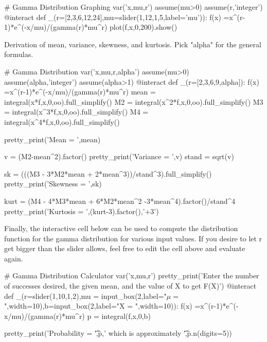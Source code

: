 \documentclass[10pt,]{book}
\numberwithin{equation}{section}
\begin{document}
%
\par
\hypertarget{p-992}{}%
\leavevmode%
%
\par
\hypertarget{p-993}{}%
\leavevmode%
\begin{sageinput}
# Gamma Distribution Graphing
var('x,mu,r')
assume(mu>0)
assume(r,'integer')
@interact
def _(r=[2,3,6,12,24],mu=slider(1,12,1,5,label='mu')):
    f(x) =x^(r-1)*e^(-x/mu)/(gamma(r)*mu^r)
    plot(f,x,0,200).show()
\end{sageinput}
%
\par
\hypertarget{p-994}{}%
Derivation of mean, variance, skewness, and kurtosis. Pick "alpha" for the general formulas. \leavevmode%
\begin{sageinput}
# Gamma Distribution
var('x,mu,r,alpha')
assume(mu>0)
assume(alpha,'integer')
assume(alpha>1)
@interact
def _(r=[2,3,6,9,alpha]):
    f(x) =x^(r-1)*e^(-x/mu)/(gamma(r)*mu^r)
    mean = integral(x*f,x,0,oo).full_simplify()
    M2 = integral(x^2*f,x,0,oo).full_simplify()
    M3 = integral(x^3*f,x,0,oo).full_simplify()
    M4 = integral(x^4*f,x,0,oo).full_simplify()
    
    pretty_print('Mean = ',mean)
    
    v = (M2-mean^2).factor()
    pretty_print('Variance = ',v)
    stand = sqrt(v)
    
    sk = (((M3 - 3*M2*mean + 2*mean^3))/stand^3).full_simplify()
    pretty_print('Skewness = ',sk)
    
    kurt = (M4 - 4*M3*mean + 6*M2*mean^2 -3*mean^4).factor()/stand^4
    pretty_print('Kurtosis = ',(kurt-3).factor(),'+3')
\end{sageinput}
%
\par
\hypertarget{p-995}{}%
Finally, the interactive cell below can be used to compute the distribution function for the gamma distribution for various input values. If you desire to let r get bigger than the slider allows, feel free to edit the cell above and evaluate again. \leavevmode%
\begin{sageinput}
# Gamma Distribution Calculator
var('x,mu,r')
pretty_print('Enter the number of successes desired, the given mean, and the value of X to get F(X)')
@interact
def _(r=slider(1,10,1,2),mu = input_box(2,label="$\mu = $",width=10),b=input_box(2,label="X = ",width=10)):
    f(x) =x^(r-1)*e^(-x/mu)/(gamma(r)*mu^r)
    p = integral(f,x,0,b)
    
    pretty_print('Probability = \t',p,' which is approximately \t',p.n(digits=5))
\end{sageinput}
%
%
%
\typeout{************************************************}
\typeout{************************************************}
%
\end{document}
